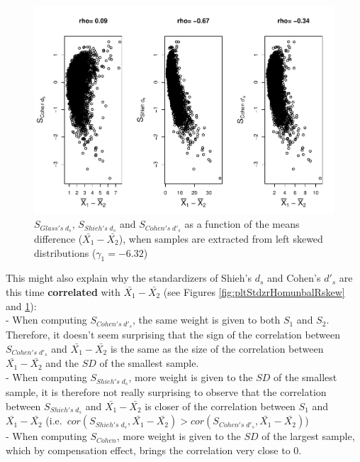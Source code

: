 \documentclass[
  man]{apa6}
\begin{document}
\begin{figure}
\centering
\includegraphics{Correlations-between-the-sample-means-difference-and-standardizers-of-all-estimators,-and-implications-on-biases-and-variances-of-all-estimators_files/figure-latex/pltStdzrHomunbalLskew-1.pdf}
\caption{\label{fig:pltStdzrHomunbalLskew}\(S_{Glass's \; d_s}\), \(S_{Shieh's \; d_s}\) and \(S_{Cohen's \; d'_s}\) as a function of the means difference (\(\bar{X_1}-\bar{X_2}\)), when samples are extracted from left skewed distributions (\(\gamma_1 = -6.32\))}
\end{figure}

This might also explain why the standardizers of Shieh's \(d_s\) and Cohen's \(d'_s\) are this time \textbf{correlated} with \(\bar{X_1}-\bar{X_2}\) (see Figures \ref{fig:pltStdzrHomunbalRskew} and \ref{fig:pltStdzrHomunbalLskew}):\\
- When computing \(S_{Cohen's \; d'_s}\), the same weight is given to both \(S_1\) and \(S_2\). Therefore, it doesn't seem surprising that the sign of the correlation between \(S_{Cohen's \; d'_s}\) and \(\bar{X_1}-\bar{X_2}\) is the same as the size of the correlation between \(\bar{X_1}-\bar{X_2}\) and the \(SD\) of the smallest sample.\\
- When computing \(S_{Shieh's \; d_s}\), more weight is given to the \(SD\) of the smallest sample, it is therefore not really surprising to observe that the correlation between \(S_{Shieh's \; d_s}\) and \(\bar{X_1}-\bar{X_2}\) is closer of the correlation between \(S_1\) and \(\bar{X_1}-\bar{X_2}\) (i.e.~\(cor(S_{Shieh's \; d_s},\bar{X_1}-\bar{X_2}) > cor(S_{Cohen's \; d'_s},\bar{X_1}-\bar{X_2})\))\\
- When computing \(S_{Cohen}\), more weight is given to the \(SD\) of the largest sample, which by compensation effect, brings the correlation very close to 0.
\end{document}
